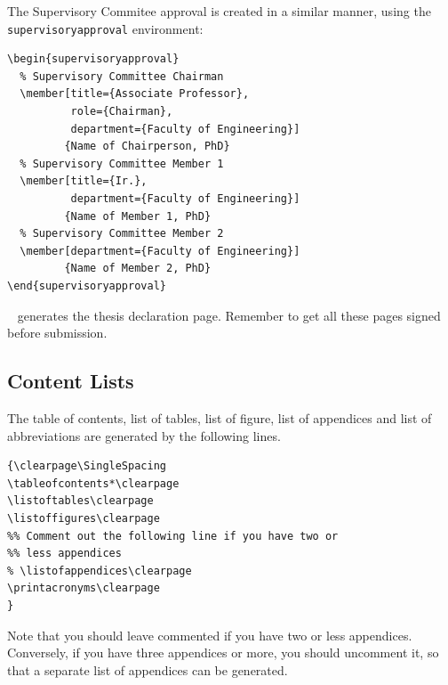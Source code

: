 \documentclass[a4paper,nofonts,raggedright,titlepage,openany]{tufte-book}
\begin{document}

The Supervisory Commitee approval is created in a similar manner, using the \texttt{supervisoryapproval} environment:

\begin{verbatim}
\begin{supervisoryapproval}
  % Supervisory Committee Chairman
  \member[title={Associate Professor},
          role={Chairman}, 
          department={Faculty of Engineering}]
         {Name of Chairperson, PhD}
  % Supervisory Committee Member 1
  \member[title={Ir.},
          department={Faculty of Engineering}]
         {Name of Member 1, PhD}
  % Supervisory Committee Member 2
  \member[department={Faculty of Engineering}]
         {Name of Member 2, PhD}
\end{supervisoryapproval}

\end{verbatim}

\texttt{\declarationpage
} generates the thesis declaration page. Remember to get all these pages signed before submission.

\subsection{Content Lists}
\label{sec:content:lists}

The table of contents, list of tables, list of figure, list of appendices  and list of abbreviations are generated by the following lines.

\begin{verbatim}
{\clearpage\SingleSpacing
\tableofcontents*\clearpage
\listoftables\clearpage
\listoffigures\clearpage
%% Comment out the following line if you have two or 
%% less appendices
% \listofappendices\clearpage
\printacronyms\clearpage
}
\end{verbatim}

Note that you should leave \texttt{\listofappendices} commented if you have two or less appendices.  Conversely,  if you have three appendices or more, you should uncomment it, so that a separate list of appendices can be generated.
\end{document}
